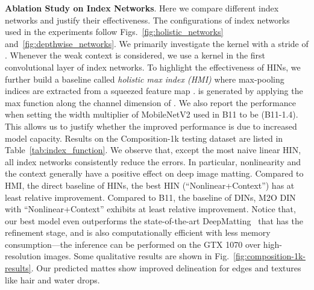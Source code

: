 \documentclass[10pt,twocolumn,letterpaper]{article}
\begin{document}
\vspace{3pt}
\noindent\textbf{Ablation Study on Index Networks}. Here we compare different index networks and justify their effectiveness. The configurations of index networks used in the experiments follow Figs.~\ref{fig:holistic_networks} and~\ref{fig:depthwise_networks}. We primarily investigate the  kernel with a stride of . Whenever the weak context is considered, we use a  kernel in the first convolutional layer of index networks. To highlight the effectiveness of HINs, we further build a baseline called \textit{holistic max index (HMI)} where max-pooling indices are extracted from a squeezed feature map .  is generated by applying the max function along the channel dimension of . We also report the performance when setting the width multiplier of MobileNetV2 used in B11 to be  (B11-1.4). This allows us to justify whether the improved performance is due to increased model capacity.
Results on the \mbox{Composition-1k} testing dataset are listed in Table~\ref{tab:index_function}. We observe that, except the most naive linear HIN, all index networks consistently reduce the errors. In particular, nonlinearity and the context generally have a positive effect on deep image matting. Compared to HMI, the direct baseline of HINs, the best HIN (``Nonlinear+Context'') has at least  relative improvement. Compared to B11, the baseline of DINs, M2O DIN with ``Nonlinear+Context'' exhibits at least  relative improvement. Notice that, our best model even outperforms the state-of-the-art DeepMatting~\cite{xu2017deep} that has the refinement stage, and is also computationally efficient with less memory consumption---the inference can be performed on the GTX 1070 over  high-resolution images. Some qualitative results are shown in Fig.~\ref{fig:composition-1k-results}. Our predicted mattes show improved delineation for edges and textures like hair and water drops.
\end{document}
